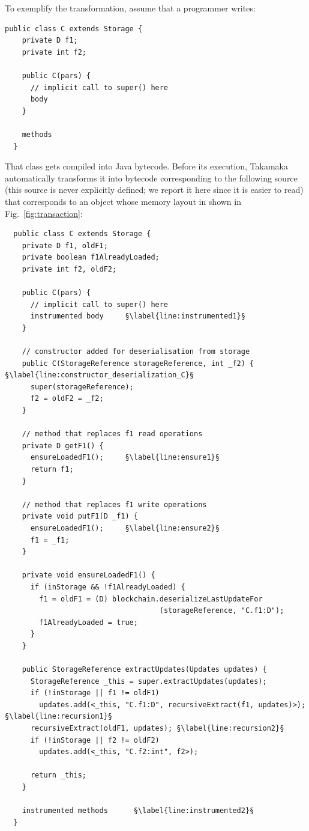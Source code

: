 \documentclass[10pt]{llncs}
\begin{document}
To exemplify the transformation, assume that a programmer writes:
%
\begin{lstlisting}[numbers=none,frame=none]
  public class C extends Storage {
    private D f1;
    private int f2;

    public C(pars) {
      // implicit call to super() here
      body
    }

    methods
  }
\end{lstlisting}
%
That class gets compiled into Java bytecode. Before its execution,
Takamaka automatically transforms it into bytecode corresponding to
the following source (this source is never explicitly
defined; we report it here since it is easier to read)
that corresponds to an object whose memory layout in shown
in Fig.~\ref{fig:transaction}:
%
\begin{lstlisting}
  public class C extends Storage {
    private D f1, oldF1;
    private boolean f1AlreadyLoaded;
    private int f2, oldF2;

    public C(pars) {
      // implicit call to super() here
      instrumented body     §\label{line:instrumented1}§
    }

    // constructor added for deserialisation from storage
    public C(StorageReference storageReference, int _f2) { §\label{line:constructor_deserialization_C}§
      super(storageReference);
      f2 = oldF2 = _f2;
    }

    // method that replaces f1 read operations
    private D getF1() {
      ensureLoadedF1();     §\label{line:ensure1}§
      return f1;
    }

    // method that replaces f1 write operations
    private void putF1(D _f1) {
      ensureLoadedF1();     §\label{line:ensure2}§
      f1 = _f1;
    }

    private void ensureLoadedF1() {
      if (inStorage && !f1AlreadyLoaded) {
        f1 = oldF1 = (D) blockchain.deserializeLastUpdateFor
                                    (storageReference, "C.f1:D");
        f1AlreadyLoaded = true;
      }
    }

    public StorageReference extractUpdates(Updates updates) {
      StorageReference _this = super.extractUpdates(updates);
      if (!inStorage || f1 != oldF1)
        updates.add(<_this, "C.f1:D", recursiveExtract(f1, updates)>); §\label{line:recursion1}§
      recursiveExtract(oldF1, updates); §\label{line:recursion2}§
      if (!inStorage || f2 != oldF2)
        updates.add(<_this, "C.f2:int", f2>);

      return _this;
    }

    instrumented methods      §\label{line:instrumented2}§
  }
\end{lstlisting}
\end{document}
